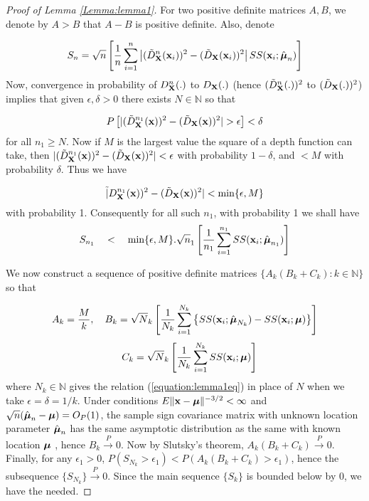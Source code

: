 \begin{proof}[Proof of Lemma \ref{Lemma:lemma1}]
For two positive definite matrices $A,B$, we denote by $A>B$ that $A-B$ is positive definite. Also, denote

$$ S_n = \sqrt n \left[ \frac{1}{n} \sum_{i=1}^n \left| (\tilde D^{n} _{\mathbf{X}} ({\bf{x}}_i))^2  - (\tilde D_{\mathbf{X}} ({\bf{x}}_i))^2 \right| SS({\bf{x}}_i; \hat{{\boldsymbol{\mu}}}_n) \right] $$
Now, convergence in probability of $D^n_{\mathbf{X}}(.)$ to $D_{\mathbf{X}}(.)$ (hence $(\tilde D^n_{\mathbf{X}}(.))^2$ to $(\tilde D_{\mathbf{X}}(.))^2$) implies that given $\epsilon, \delta > 0$ there exists $N \in \mathbb{N}$ so that

$$ P \left[ |(\tilde D^{n_1}_{\mathbf{X}}({\bf{x}}))^2 - (\tilde D_{\mathbf{X}}({\bf{x}}))^2| > \epsilon \right] < \delta $$
for all $n_1 \geq N$. Now if $M$ is the largest value the square of a depth function can take, then $|(\tilde D^{n_1}_{\mathbf{X}}({\bf{x}}))^2 - (\tilde D_{\mathbf{X}}({\bf{x}}))^2| < \epsilon$ with probability $1-\delta$, and $< M$ with probability $\delta$. Thus we have

\begin{equation}
\label{equation:lemma1eq}
\tilde | D^{n_1}_{\mathbf{X}}({\bf{x}}))^2 - (\tilde D_{\mathbf{X}}({\bf{x}}))^2 | < \min \{ \epsilon, M \}
\end{equation}
with probability 1. Consequently for all such $n_1$, with probability 1 we shall have
$$ S_{n_1} \quad < \quad \min \{ \epsilon, M \} . \sqrt n_1 \left[ \frac{1}{n_1} \sum_{i=1}^{n_1} SS({\bf{x}}_i; \hat{{\boldsymbol{\mu}}}_{n_1}) \right] $$

We now construct a sequence of positive definite matrices $\{A_k (B_k+C_k) : k \in \mathbb N\} $ so that

$$ A_k = \frac{M}{k}, \quad B_k = \sqrt N_k \left[ \frac{1}{N_k} \sum_{i=1}^{N_k} \left\{ SS({\bf{x}}_i; \hat{{\boldsymbol{\mu}}}_{N_k}) - SS({\bf{x}}_i; {\boldsymbol{\mu}}) \right\} \right] $$
$$ \quad C_k = \sqrt N_k \left[ \frac{1}{N_k} \sum_{i=1}^{N_k} SS({\bf{x}}_i; {\boldsymbol{\mu}}) \right] $$
where $N_k \in \mathbb N$ gives the relation (\ref{equation:lemma1eq}) in place of $N$ when we take $\epsilon = \delta  =1/k$. Under conditions $ E\|{\bf{x}} - {\boldsymbol{\mu}}\|^{-3/2} < \infty $ and $\sqrt n (\hat{{\boldsymbol{\mu}}}_n - {\boldsymbol{\mu}}) = O_P(1)$, the sample sign covariance matrix with unknown location parameter $\hat{{\boldsymbol{\mu}}}_n$ has the same asymptotic distribution as the same with known location ${\boldsymbol{\mu}}$ \citep{durre14}, hence $B_k \stackrel{P}{\rightarrow} 0$. Now by Slutsky's theorem, $A_k (B_k+C_k) \stackrel{P}{\rightarrow} 0$. Finally, for any $\epsilon_1 > 0$, $ P(S_{N_k} > \epsilon_1) < P(A_k (B_k + C_k) > \epsilon_1)$, hence the subsequence $\{S_{N_k}\} \stackrel{P}{\rightarrow} 0$. Since the main sequence $\{S_k\}$ is bounded below by 0, we have the needed.
\end{proof}


